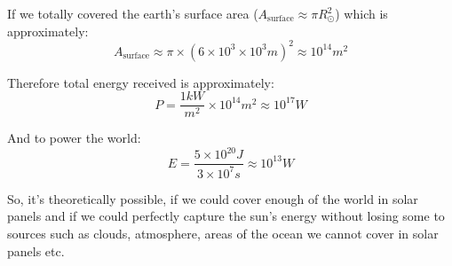 If we totally covered the earth's surface area ($A_{\text{surface}} \approx \pi R_{\odot}^2$) which is approximately:
\[
    A_{\text{surface}} \approx \pi \times (6\times10^3\times10^3m)^2 \approx 10^{14}m^2
\]

Therefore total energy received is approximately:
\[
    P = \frac{1kW}{m^2} \times 10^{14}m^2 \approx 10^{17}W
\]

And to power the world:
\[
    E = \frac{5 \times 10^{20}J}{3 \times 10^7s} \approx 10^{13}W
\]

So, it's theoretically possible, if we could cover enough of the world in solar panels and if we could perfectly capture the sun's energy without losing some to sources such as clouds, atmosphere, areas of the ocean we cannot cover in solar panels etc.

